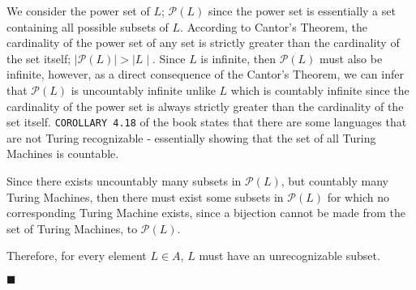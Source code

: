 \documentclass[addpoints,a4paper]{exam}
\begin{document}
\begin{questions}
\begin{solution}
    We consider the power set of $L$; $ \mathcal{P}(L) $ since the power set is essentially a set containing all possible subsets of $L$. According to Cantor's Theorem, the cardinality of the power set of any set is strictly greater than the cardinality of the set itself; $ \mid \mathcal{P}(L) \mid > \mid L \mid $. Since $L$ is infinite, then $ \mathcal{P}(L) $ must also be infinite, however, as a direct consequence of the Cantor's Theorem, we can infer that $ \mathcal{P}(L) $ is uncountably infinite unlike $L$ which is countably infinite since the cardinality of the power set is always strictly greater than the cardinality of the set itself. \texttt{COROLLARY 4.18} of the book states that there are some languages that are not Turing recognizable - essentially showing that the set of all Turing Machines is countable. 
    
    Since there exists uncountably many subsets in $ \mathcal{P}(L) $, but countably many Turing Machines, then there must exist some subsets in $ \mathcal{P}(L) $ for which no corresponding Turing Machine exists, since a bijection cannot be made from the set of Turing Machines, to $ \mathcal{P}(L) $. 
    
    Therefore, for every element $ L \in A $, $L$ must have an unrecognizable subset. \vspace*{-4mm}
    \begin{flushright}
      $ \blacksquare $
    \end{flushright}
  \end{solution}
  
  
\end{questions}
\end{document}

